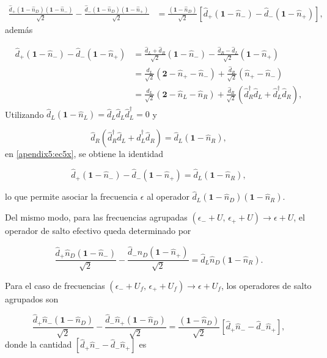 \begin{appendixs}
\begin{align*}
    \frac{\hat{d}_{+}(\textbf{1}-\hat{n}_{D})(\textbf{1}-\hat{n}_{-})}{\sqrt{2}} - \frac{\hat{d}_{-}(\textbf{1}-\hat{n}_{D})(\textbf{1}-\hat{n}_{+})}{\sqrt{2}} & = \frac{(\textbf{1}-\hat{n}_{D})}{\sqrt{2}} [\hat{d}_{+}(\textbf{1}-\hat{n}_{-}) - \hat{d}_{-}(\textbf{1}-\hat{n}_{+}) ],
\end{align*}
además 

\begin{align}
    \hat{d}_{+}(\textbf{1}-\hat{n}_{-}) - \hat{d}_{-}(\textbf{1}-\hat{n}_{+}) & = \frac{\hat{d}_{L} + \hat{d}_{R}}{\sqrt{2}} (\textbf{1} - \hat{n}_{-}) - \frac{\hat{d}_{R} - \hat{d}_{L}}{\sqrt{2}}(\textbf{1}-\hat{n}_{+}) \\
    & = \frac{\hat{d}_{L}}{\sqrt{2}}(\textbf{2} - \hat{n}_{+} -\hat{n}_{-} ) + \frac{\hat{d}_{R}}{\sqrt{2}}(\hat{n}_{+} -\hat{n}_{-}) \\
    & = \frac{\hat{d}_{L}}{\sqrt{2}}(\textbf{2}-\hat{n}_{L} -\hat{n}_{R}) + \frac{\hat{d}_{R}}{\sqrt{2}}(\hat{d}^{\dagger}_{R}\hat{d}_{L}+\hat{d}^{\dagger}_{L}\hat{d}_{R}),
    \label{apendix5:ec5x}
\end{align}
Utilizando $\hat{d}_{L}(\mathbf{1} - \hat{n}_{L}) = \hat{d}_{L}\hat{d}_{L}\hat{d}^{\dagger}_{L} = 0$ y 

\[
\hat{d}_{R}(\hat{d}^{\dagger}_{R}\hat{d}_{L} + \hat{d}^{\dagger}_{L}\hat{d}_{R}) = \hat{d}_{L}(\mathbf{1} - \hat{n}_{R}),
\]
en \ref{apendix5:ec5x}, se obtiene la identidad

\[
\hat{d}_{+}(\mathbf{1} - \hat{n}_{-}) - \hat{d}_{-}(\mathbf{1} - \hat{n}_{+}) = \hat{d}_{L}(\mathbf{1} - \hat{n}_{R}),
\]

lo que permite asociar la frecuencia $\epsilon$ al operador $\hat{d}_{L}(\mathbf{1} - \hat{n}_{D})(\mathbf{1} - \hat{n}_{R})$.

Del mismo modo, para las frecuencias agrupadas $(\epsilon_{-} + U,\, \epsilon_{+} + U) \to \epsilon + U$, el operador de salto efectivo queda determinado por

\[
\frac{\hat{d}_{+}\hat{n}_{D}(\mathbf{1} - \hat{n}_{-})}{\sqrt{2}} - \frac{\hat{d}_{-}\hat{n}_{D}(\mathbf{1} - \hat{n}_{+})}{\sqrt{2}} = \hat{d}_{L}\hat{n}_{D}(\mathbf{1} - \hat{n}_{R}).
\]

Para el caso de frecuencias $(\epsilon_{-} + U_{f},\, \epsilon_{+} + U_{f}) \to \epsilon + U_{f}$, los operadores de salto agrupados son

\[
\frac{\hat{d}_{+}\hat{n}_{-}(\mathbf{1} - \hat{n}_{D})}{\sqrt{2}} - \frac{\hat{d}_{-}\hat{n}_{+}(\mathbf{1} - \hat{n}_{D})}{\sqrt{2}} = \frac{(\mathbf{1} - \hat{n}_{D})}{\sqrt{2}}\left[\hat{d}_{+}\hat{n}_{-} - \hat{d}_{-}\hat{n}_{+}\right],
\]
donde la cantidad $\left[\hat{d}_{+}\hat{n}_{-} - \hat{d}_{-}\hat{n}_{+}\right]$ es 


\end{appendixs}
